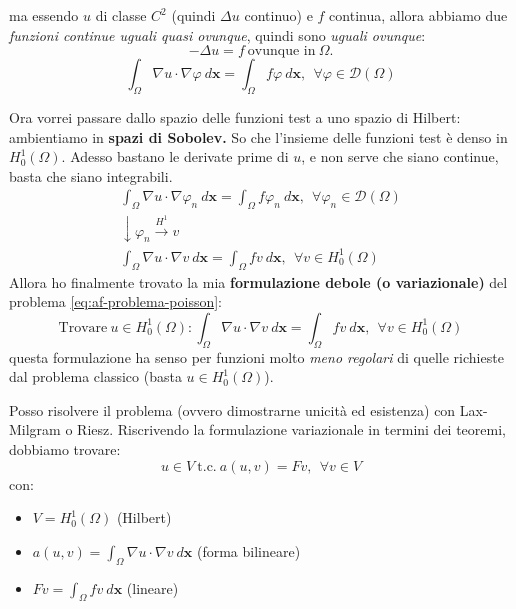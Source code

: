 \documentclass[10pt,a4paper,twoside,openright]{book}
\begin{document}
\begin{itemize}
{	      	ma essendo $\displaystyle u$ di classe $\displaystyle C^{2}$ (quindi $\displaystyle \Delta u$ continuo) e $\displaystyle f$ continua, allora abbiamo due \textit{funzioni continue uguali quasi ovunque}, quindi sono \textit{uguali ovunque}:
	      	\begin{equation*}
	      		-\Delta u=f\ \text{ovunque in} \ \Omega .
	      	\end{equation*}}
	      \begin{equation}
	      	\boxed{\int _{\Omega } \nabla u\cdotp \nabla \varphi \ d\mathbf{x} =\int _{\Omega } f\varphi \ d\mathbf{x} ,\ \ \forall \varphi \in \mathcal{D}( \Omega )}
	      \end{equation}
\end{itemize}

Ora vorrei passare dallo spazio delle funzioni test a uno spazio di Hilbert: ambientiamo in \textbf{spazi di Sobolev. }So che l'insieme delle funzioni test è denso in $\displaystyle H_{0}^{1}( \Omega )$. Adesso bastano le derivate prime di $\displaystyle u$, e non serve che siano continue, basta che siano integrabili.
\begin{gather*}
	\int _{\Omega } \nabla u\cdotp \nabla \varphi _{n} \ d\mathbf{x} =\int _{\Omega } f\varphi _{n} \ d\mathbf{x} ,\ \ \forall \varphi _{n} \in \mathcal{D}( \Omega )\\
	\downarrow \varphi _{n}\xrightarrow{H^{1}} v\\
	\int _{\Omega } \nabla u\cdotp \nabla v\ d\mathbf{x} =\int _{\Omega } fv\ d\mathbf{x} ,\ \ \forall v\in H_{0}^{1}( \Omega )
\end{gather*}
Allora ho finalmente trovato la mia \textbf{formulazione debole (o variazionale)} del problema \eqref{eq:af-problema-poisson}: 
\begin{equation}
	\boxed{\text{Trovare} \ u\in H_{0}^{1}( \Omega ) :\int _{\Omega } \nabla u\cdotp \nabla v\ d\mathbf{x} =\int _{\Omega } fv\ d\mathbf{x} ,\ \ \forall v\in H_{0}^{1}( \Omega )}
\end{equation}
questa formulazione ha senso per funzioni molto \textit{meno regolari} di quelle richieste dal problema classico (basta $\displaystyle u\in H_{0}^{1}( \Omega )$).

Posso risolvere il problema (ovvero dimostrarne unicità ed esistenza) con Lax-Milgram o Riesz. Riscrivendo la formulazione variazionale in termini dei teoremi, dobbiamo trovare:
\begin{equation*}
	u\in V\ \text{t.c.} \ a( u,v) =Fv,\ \ \forall v\in V
\end{equation*}
con:
\begin{itemize}
	\item $\displaystyle V=H_{0}^{1}( \Omega )$ (Hilbert)
	\item $\displaystyle a( u,v) =\int _{\Omega } \nabla u\cdotp \nabla v\ d\mathbf{x}$ (forma bilineare)
	\item $\displaystyle Fv=\int _{\Omega } fv\ d\mathbf{x}$ (lineare)
\end{itemize}
\end{document}
